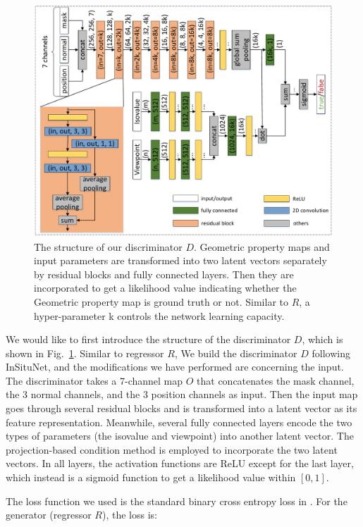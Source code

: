 \documentclass[journal]{vgtc}                %
\begin{document}
\begin{figure}
  \centering
  \includegraphics[width=1\linewidth]{discriminator}
  \caption{The structure of our discriminator $D$. Geometric property maps and input parameters are transformed into two latent vectors separately by residual blocks and fully connected layers. Then they are incorporated to get a likelihood value indicating whether the Geometric property map is ground truth or not. Similar to $R$, a hyper-parameter k controls the network learning capacity. }
  \label{fig:discriminator}
\end{figure}

We would like to first introduce the structure of the discriminator $D$, which is shown in Fig.~\ref{fig:discriminator}. Similar to regressor $R$, We build the discriminator $D$ following InSituNet, and the modifications we have performed are concerning the input. The discriminator takes a 7-channel map $O$ that concatenates the mask channel, the 3 normal channels, and the 3 position channels as input. Then the input map goes through several residual blocks and is transformed into a latent vector as its feature representation. Meanwhile, several fully connected layers encode the two types of parameters (the isovalue and viewpoint) into another latent vector. The projection-based condition method \cite{miyato2018cgans} is employed to incorporate the two latent vectors. In all layers, the activation functions are ReLU except for the last layer, which instead is a sigmoid function to get a likelihood value within $[0, 1]$.

The loss function we used is the standard binary cross entropy loss in \cite{goodfellow2014generative}. For the generator (regressor $R$), the loss is:
\end{document}
